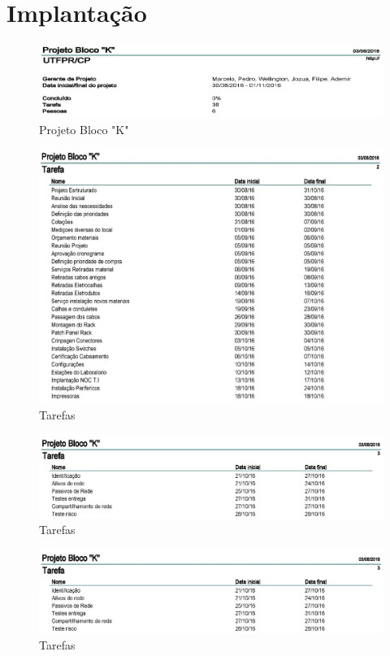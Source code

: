 \documentclass[	DIV=calc,%
paper=a4,%
fontsize=12pt,%
onecolumn]{scrartcl}	 					%
\begin{document}
	\section{Implantação}
	\begin{figure}[!h]
		\centering
		\caption{Projeto Bloco "K"}
		\includegraphics{a1}
	\end{figure}
	\begin{figure}[!h]
		\centering
		\caption{Tarefas}
		\includegraphics{a2}
	\end{figure}
	\begin{figure}[!h]
		\centering
		\caption{Tarefas}
		\includegraphics{a3}
	\end{figure}
	\begin{figure}[!h]
		\centering
		\caption{Tarefas}
		\includegraphics{a3}
	\end{figure}
\end{document}
